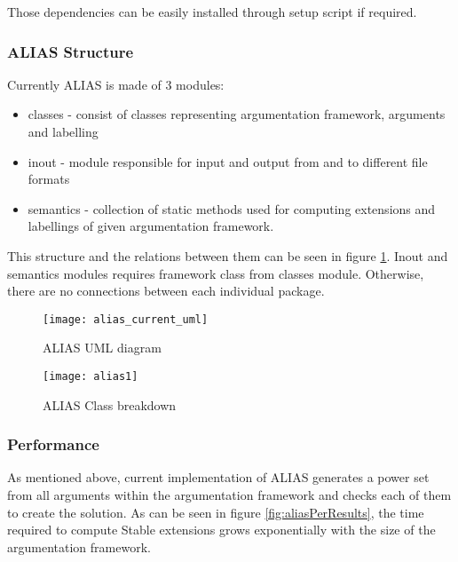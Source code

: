 Those dependencies can be easily installed through setup script if required. 

\subsubsection{ALIAS Structure}
Currently ALIAS is made of 3 modules: 

\begin{itemize}
	\item classes - consist of classes representing argumentation framework, arguments and labelling
	\item inout - module responsible for input and output from and to different file formats
	\item semantics - collection of static methods used for computing extensions and labellings of given argumentation framework.
\end{itemize}

This structure and the relations between them can be seen in figure \ref{fig:aliasUml1}. Inout and semantics modules requires framework class from classes module. Otherwise, there are no connections between each individual package.

\begin{figure}[h]
	\texttt{[image: alias\_current\_uml]}
	\caption{ALIAS UML diagram}
	\label{fig:aliasUml1}
\end{figure}



\begin{landscape}
	\begin{figure}
		\texttt{[image: alias1]}
		\caption{ALIAS Class breakdown}
		\label{fig:aliasClassBreakdown}
	\end{figure}
\end{landscape}

\subsubsection{Performance}
As mentioned above, current implementation of ALIAS generates a power set from all arguments within the argumentation framework and checks each of them to create the solution. As can be seen in figure \ref{fig:aliasPerResults}, the time required to compute Stable extensions grows exponentially with the size of the argumentation framework. 

